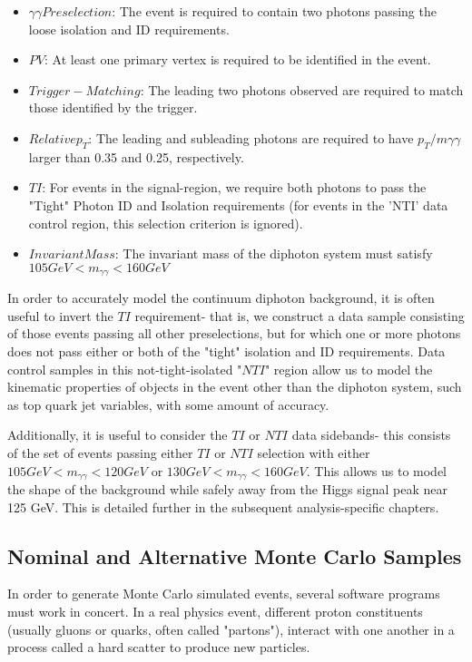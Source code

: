 \begin{itemize}
\item $\gamma\gamma Preselection$: The event is required to contain two photons passing the loose isolation and ID requirements.
\item $PV$: At least one primary vertex is required to be identified in the event.
\item $Trigger-Matching$: The leading two photons observed are required to match those identified by the trigger.
\item $Relative p_{T}$: The leading and subleading photons are required to have $p_{T}/m\gamma\gamma$ larger than 0.35 and 0.25, respectively.
\item $TI$: For events in the signal-region, we require both photons to pass the "Tight" Photon ID and Isolation requirements (for events in the 'NTI' data control region, this selection criterion is ignored). 
\item $Invariant Mass$: The invariant mass of the diphoton system must satisfy $105 GeV < m_{\gamma\gamma} < 160 GeV$
\end{itemize}

In order to accurately model the continuum diphoton background, it is often useful to invert the $TI$ requirement- that is, we construct a data sample consisting of those events passing all other preselections, but for which one or more photons does not pass either or both of the "tight" isolation and ID requirements. Data control samples in this not-tight-isolated "$NTI$" region allow us to model the kinematic properties of objects in the event other than the diphoton system, such as top quark jet variables, with some amount of accuracy.

Additionally, it is useful to consider the $TI$ or $NTI$ data sidebands- this consists of the set of events passing either $TI$ or $NTI$ selection with either $105 GeV < m_{\gamma\gamma} < 120 GeV$ or $130 GeV < m_{\gamma\gamma} < 160 GeV$. This allows us to model the shape of the background while safely away from the Higgs signal peak near 125 GeV. This is detailed further in the subsequent analysis-specific chapters.

\subsection{Nominal and Alternative Monte Carlo Samples} \label{sec:NominalMC} 

In order to generate Monte Carlo simulated events, several software programs must work in concert. In a real physics event, different proton constituents (usually gluons or quarks, often called "partons"), interact with one another in a process called a hard scatter to produce new particles. 

